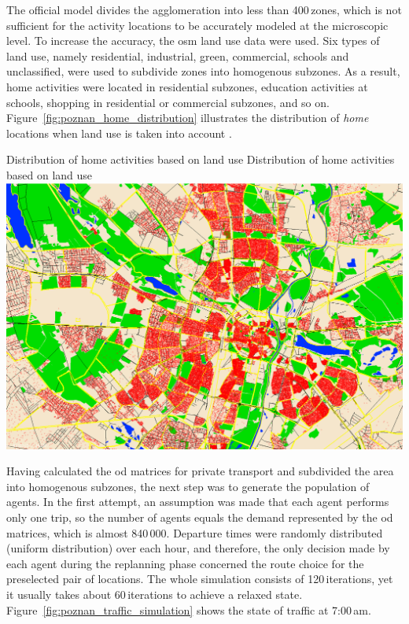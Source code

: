 The official model divides the agglomeration into less than 400\,zones, which is not sufficient for the activity locations to be accurately modeled at the microscopic level. To increase the accuracy, the \gls{osm} land use data were used. Six types of land use, namely residential, industrial, green, commercial, schools and unclassified, were used to subdivide zones into homogenous subzones. As a result, home activities were located in residential subzones, education activities at schools, shopping in residential or commercial subzones, and so on. Figure~\ref{fig:poznan_home_distribution} illustrates the distribution of \emph{home} locations when land use is taken into account \cite{PiatkowskiMaciejewski2013LandUse}.

\createfigure%
{Distribution of home activities based on land use}%
{Distribution of home activities based on land use}%
{\label{fig:poznan_home_distribution}}%
{\includegraphics[width=\textwidth, angle=0]{using/figures/poznan_home_distribution}}%
{}%

Having calculated the \gls{od} matrices for private transport and subdivided the area into homogenous subzones, the next step was to generate the population of agents. In the first attempt, an assumption was made that each agent performs only one trip, so the number of agents equals the demand represented by the \gls{od} matrices, which is almost 840\,000. Departure times were randomly distributed (uniform distribution) over each hour, and therefore, the only decision made by each agent during the replanning phase concerned the route choice for the preselected pair of locations. The whole simulation consists of 120\,iterations, yet it usually takes about 60\,iterations to achieve a relaxed state. Figure~\ref{fig:poznan_traffic_simulation} shows the state of traffic at 7:00\,am.

